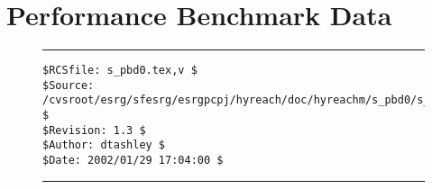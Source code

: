 %
\section{Performance Benchmark Data}
\label{spbd0}


\noindent\begin{figure}[!b]
\noindent\rule[-0.25in]{\textwidth}{1pt}
\begin{tiny}
\begin{verbatim}
$RCSfile: s_pbd0.tex,v $
$Source: /cvsroot/esrg/sfesrg/esrgpcpj/hyreach/doc/hyreachm/s_pbd0/s_pbd0.tex,v $
$Revision: 1.3 $
$Author: dtashley $
$Date: 2002/01/29 17:04:00 $
\end{verbatim}
\end{tiny}
\noindent\rule[0.25in]{\textwidth}{1pt}
\end{figure}
%
%
%
